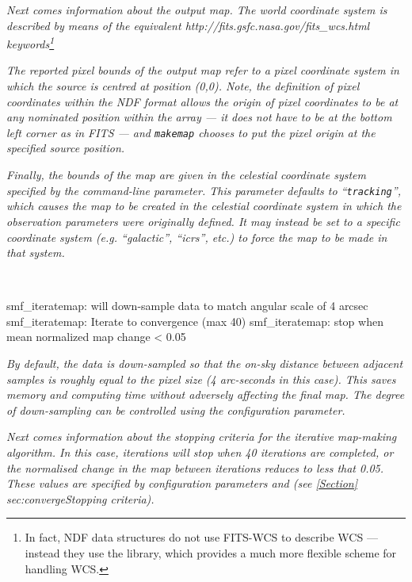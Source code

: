 \emph{Next comes information about the output map. The world coordinate
system is described by means of the equivalent 
{http://fits.gsfc.nasa.gov/fits_wcs.html} keywords\footnote{In fact, NDF
data structures do not use FITS-WCS to describe WCS --- instead they use the
 library, which
provides a much more flexible scheme for handling WCS.}}

\emph{The reported pixel bounds of the output map refer to a pixel coordinate
system in which the source is centred at position (0,0). Note, the definition of
pixel coordinates within the NDF format allows the origin of pixel
coordinates to be at any nominated position within the array --- it does
not have to be at the bottom left corner as in FITS --- and \texttt{makemap}
chooses to put the pixel origin at the specified source position. }

\emph{Finally, the bounds of the map are given in the celestial coordinate
system specified by the  command-line
parameter.  This parameter defaults to ``\texttt{tracking}'', which causes
the map to be created in the celestial coordinate system in which the
observation parameters were originally defined. It may instead be set to a
specific coordinate system (e.g. ``galactic'', ``icrs'', etc.) to force the
map to be made in that system.}

~
\begin{terminalv}
smf_iteratemap: will down-sample data to match angular scale of 4 arcsec
smf_iteratemap: Iterate to convergence (max 40)
smf_iteratemap: stop when mean normalized map change < 0.05
\end{terminalv}

\emph{By default, the data is down-sampled so that the on-sky distance between
adjacent samples is roughly equal to the pixel size (4 arc-seconds in
this case). This saves memory and computing time without adversely
affecting the final map. The degree of down-sampling can be controlled
using the  configuration parameter.}

\emph{Next comes information about the stopping criteria for the iterative
map-making algorithm. In this case, iterations will stop when 40 iterations are
completed, or the normalised change in the map between iterations reduces
to less that 0.05. These values are specified by configuration parameters
 and  (see \cref{Section}
{sec:converge}{Stopping criteria}).}


